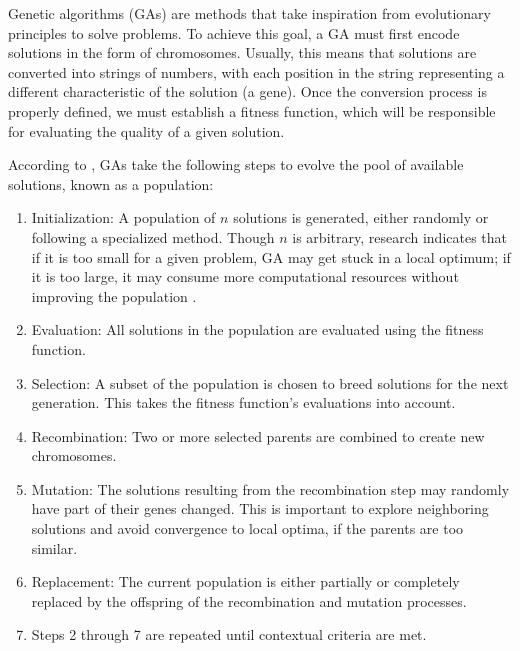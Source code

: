 Genetic algorithms (GAs) are methods that take inspiration from evolutionary principles to solve problems. To achieve this goal, a GA must first encode solutions in the form of chromosomes. Usually, this means that solutions are converted into strings of numbers, with each position in the string representing a different characteristic of the solution (a gene). Once the conversion process is properly defined, we must establish a fitness function, which will be responsible for evaluating the quality of a given solution.

According to \textcite{SASTRY2005}, GAs take the following steps to evolve the pool of available solutions, known as a population:

\begin{enumerate}
    \item Initialization: A population of $n$ solutions is generated, either randomly or following a specialized method. Though $n$ is arbitrary, research indicates that if it is too small for a given problem, GA may get stuck in a local optimum; if it is too large, it may consume more computational resources without improving the population \cite{ROEVA2013}.
    \item Evaluation: All solutions in the population are evaluated using the fitness function.
    \item Selection: A subset of the population is chosen to breed solutions for the next generation. This takes the fitness function's evaluations into account.
    \item Recombination: Two or more selected parents are combined to create new chromosomes.
    \item Mutation: The solutions resulting from the recombination step may randomly have part of their genes changed. This is important to explore neighboring solutions and avoid convergence to local optima, if the parents are too similar.
    \item Replacement: The current population is either partially or completely replaced by the offspring of the recombination and mutation processes.
    \item Steps 2 through 7 are repeated until contextual criteria are met.
\end{enumerate}